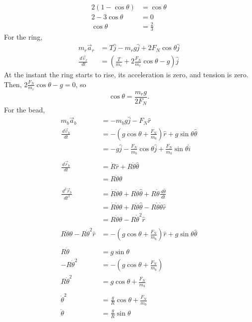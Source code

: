 \documentclass{esg8012pset}
\renewcommand{\d}{\,d}
\begin{document}
\begin{solution}
\begin{enumerate}[a)]
\begin{align*}
     2 (1 - \cos\theta) & = \cos\theta \\
     2 - 3\cos\theta & = 0 \\
     \cos\theta & = \frac{2}{3}
   \end{align*}
   For the ring,
   \begin{align*}
     m_r \vec a_r & = T\hat j - m_r g \hat j + 2 F_N\cos\theta \hat j \\
     \frac{\d \vec v_r}{\d t} & = \left(\frac{T}{m_r} + 2 \frac{F_N}{m_r}\cos\theta - g\right)\hat j
   \end{align*}
   At the instant the ring starts to rise, its acceleration is zero, and tension is zero.  Then, $2 \frac{F_N}{m_r}\cos\theta - g = 0$, so $$\cos\theta = \frac{m_r g}{2F_N}.$$
   For the bead,
   \begin{align*}
    m_b \vec a_b & = -m_b g\hat j -F_N\hat r \\
    \frac{\d \vec v_b}{\d t} & = -\left(g\cos\theta + \frac{F_N}{m_b}\right)\hat r + g\sin\theta\hat\theta  \\
    & = -g\hat j - \frac{F_N}{m_b}\cos\theta\hat j + \frac{F_N}{m_b}\sin\theta\hat i \\
    \\
    \frac{\d \vec r_b}{\d t} & = \dot R\hat r + R\dot\theta\hat\theta \\
     & = R\dot\theta\hat\theta \\
    \\
    \frac{\d^2 \vec r_b}{\d t^2} & = \dot R\dot\theta\hat \theta + R\ddot\theta\hat\theta + R\dot\theta \frac{\d\hat\theta}{\d t} \\
     & = \dot R\dot\theta\hat \theta + R\ddot\theta\hat\theta - R\dot\theta\dot\theta\hat r \\
     & = R\ddot\theta\hat\theta - R\dot\theta^2\hat r \\
    \\
    R\ddot\theta\hat\theta - R\dot\theta^2\hat r & = -\left(g\cos\theta + \frac{F_N}{m_b}\right)\hat r + g\sin\theta\hat\theta \\
    \\
    R\ddot\theta & = g\sin\theta \\
    -R\dot\theta^2 & = -\left(g\cos\theta + \frac{F_N}{m_b}\right) \\
    R\dot\theta^2 & = g\cos\theta + \frac{F_N}{m_b} \\
    \\
    \dot\theta^2 & = \frac{g}{R}\cos\theta + \frac{F_N}{m_b} \\
    \ddot\theta & = \frac{g}{R}\sin\theta
   \end{align*}


\end{enumerate}
\end{solution}
\end{document}
